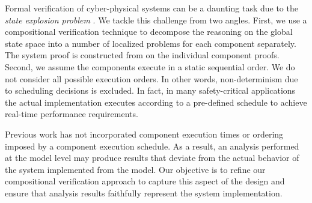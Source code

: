 
Formal verification of cyber-physical systems can be a daunting task due to the \emph{state
explosion problem} \cite{Clarke2012}. We tackle this challenge from two angles. First, we use a
compositional verification technique \cite{cmc} to decompose the reasoning on the global state space into a
number of localized problems for each component separately. The system proof is constructed
from on the individual component proofs. Second, we assume the components execute in a static 
sequential order. We do not consider all possible execution orders. In other words, non-determinism
due to scheduling decisions is excluded. In fact, in many safety-critical applications the actual
implementation executes according to a pre-defined schedule to achieve real-time performance
requirements.  

Previous work has not incorporated component execution times or ordering imposed by 
a component execution schedule. As a result, an analysis performed at the model level 
may produce results that deviate from the actual behavior of the system implemented 
from the model.  Our objective is to refine our compositional verification approach to capture 
this aspect of the design and ensure that analysis results faithfully represent the system 
implementation.  

